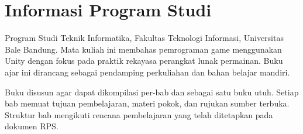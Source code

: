 \documentclass[../main.tex]{subfiles}
\begin{document}
\chapter*{Informasi Program Studi}
Program Studi Teknik Informatika, Fakultas Teknologi Informasi, Universitas Bale Bandung. Mata kuliah ini membahas pemrograman game menggunakan Unity dengan fokus pada praktik rekayasa perangkat lunak permainan. Buku ajar ini dirancang sebagai pendamping perkuliahan dan bahan belajar mandiri.

Buku disusun agar dapat dikompilasi per-bab dan sebagai satu buku utuh. Setiap bab memuat tujuan pembelajaran, materi pokok, dan rujukan sumber terbuka. Struktur bab mengikuti rencana pembelajaran yang telah ditetapkan pada dokumen RPS.

\onlyinsubfile{\printbibliography}
\end{document}
